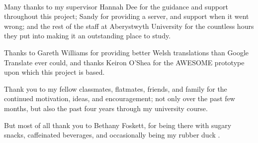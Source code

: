 \begin{center}
~\\
\vfill

Many thanks to my supervisor Hannah Dee for the guidance and support throughout this project; Sandy for providing a server, and support when it went wrong; and the rest of the staff at Aberystwyth University for the countless hours they put into making it an outstanding place to study.

Thanks to Gareth Williams for providing better Welsh translations than Google Translate ever could, and thanks Keiron O'Shea for the \acs{AWESOME} prototype upon which this project is based.

Thank you to my fellow classmates, flatmates, friends, and family for the continued motivation, ideas, and encouragement; not only over the past few months, but also the past four years through my university course.

But most of all thank you to Bethany Foskett, for being there with sugary snacks, caffeinated beverages, and occasionally being my rubber duck \cite{c2-rubber-ducking}.

\vfill
~\\
\end{center}